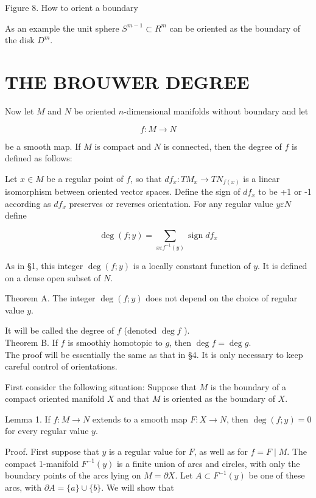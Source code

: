 \documentclass[10pt, letterpaper]{article}
\begin{document}
Figure 8. How to orient a boundary

As an example the unit sphere $S^{m-1} \subset R^{m}$ can be oriented as the boundary of the disk $D^{m}$.

\section*{THE BROUWER DEGREE}
Now let $M$ and $N$ be oriented $n$-dimensional manifolds without boundary and let

$$
f: M \rightarrow N
$$

be a smooth map. If $M$ is compact and $N$ is connected, then the degree of $f$ is defined as follows:

Let $x \in M$ be a regular point of $f$, so that $d f_{x}: T M_{x} \rightarrow T N_{f(x)}$ is a linear isomorphism between oriented vector spaces. Define the sign of $d f_{x}$ to be +1 or -1 according as $d f_{x}$ preserves or reverses orientation. For any regular value $y \varepsilon N$ define

$$
\operatorname{deg}(f ; y)=\sum_{x \varepsilon f^{-1}(y)} \operatorname{sign} d f_{x}
$$

As in §1, this integer $\operatorname{deg}(f ; y)$ is a locally constant function of $y$. It is defined on a dense open subset of $N$.

Theorem A. The integer $\operatorname{deg}(f ; y)$ does not depend on the choice of regular value $y$.

It will be called the degree of $f$ (denoted $\operatorname{deg} f$ ).\\
Theorem B. If $f$ is smoothiy homotopic to $g$, then $\operatorname{deg} f=\operatorname{deg} g$.\\
The proof will be essentially the same as that in §4. It is only necessary to keep careful control of orientations.

First consider the following situation: Suppose that $M$ is the boundary of a compact oriented manifold $X$ and that $M$ is oriented as the boundary of $X$.

Lemma 1. If $f: M \rightarrow N$ extends to a smooth map $F: X \rightarrow N$, then $\operatorname{deg}(f ; y)=0$ for every regular value $y$.

Proof. First suppose that $y$ is a regular value for $F$, as well as for $f=F \mid M$. The compact 1-manifold $F^{-1}(y)$ is a finite union of arcs and circles, with only the boundary points of the arcs lying on $M=\partial X$. Let $A \subset F^{-1}(y)$ be one of these arcs, with $\partial A=\{a\} \cup\{b\}$. We will show that
\end{document}
